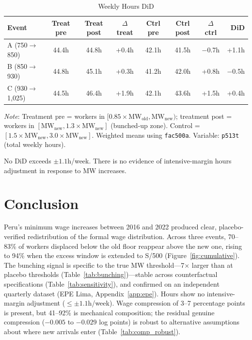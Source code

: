 \documentclass[12pt]{article}
\begin{document}
\begin{table}[H]
\centering
\caption{Weekly Hours DiD}
\label{tab:hours}
\begin{threeparttable}
\small
\begin{tabular}{lccccccr}
\toprule
Event & Treat pre & Treat post & $\Delta$ treat & Ctrl pre & Ctrl post & $\Delta$ ctrl & DiD \\
\midrule
A (750$\to$850) & 44.4h & 44.8h & +0.4h & 42.1h & 41.5h & $-$0.7h & +1.1h \\
B (850$\to$930) & 44.8h & 45.1h & +0.3h & 41.2h & 42.0h & +0.8h & $-$0.5h \\
C (930$\to$1,025) & 44.5h & 46.4h & +1.9h & 42.1h & 43.6h & +1.5h & +0.4h \\
\bottomrule
\end{tabular}
\begin{tablenotes}
\small
\item \textit{Note}: Treatment pre = workers in $[0.85 \times \text{MW}_\text{old}, \text{MW}_\text{new})$; treatment post = workers in $[\text{MW}_\text{new}, 1.3 \times \text{MW}_\text{new}]$ (bunched-up zone). Control = $[1.5 \times \text{MW}_\text{new}, 3.0 \times \text{MW}_\text{new}]$. Weighted means using \texttt{fac500a}. Variable: \texttt{p513t} (total weekly hours).
\end{tablenotes}
\end{threeparttable}
\end{table}

No DiD exceeds $\pm 1.1$h/week. There is no evidence of intensive-margin hours adjustment in response to MW increases.

\section{Conclusion}\label{sec:conclusion}

Peru's minimum wage increases between 2016 and 2022 produced clear, placebo-verified redistribution of the formal wage distribution. Across three events, 70--83\% of workers displaced below the old floor reappear above the new one, rising to 94\% when the excess window is extended to S/500 (Figure~\ref{fig:cumulative}). The bunching signal is specific to the true MW threshold---7$\times$ larger than at placebo thresholds (Table~\ref{tab:bunching})---stable across counterfactual specifications (Table~\ref{tab:sensitivity}), and confirmed on an independent quarterly dataset (EPE Lima, Appendix~\ref{app:epe}). Hours show no intensive-margin adjustment ($\leq \pm 1.1$h/week). Wage compression of 3--7 percentage points is present, but 41--92\% is mechanical composition; the residual genuine compression ($-0.005$ to $-0.029$ log points) is robust to alternative assumptions about where new arrivals enter (Table~\ref{tab:comp_robust}).
\end{document}

